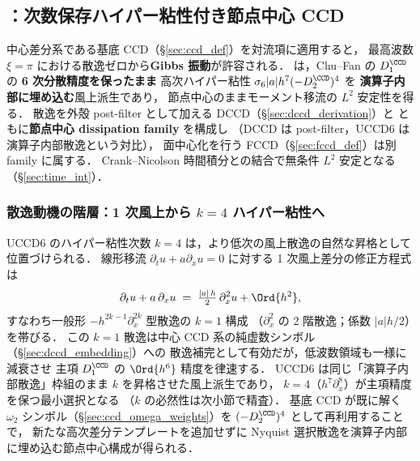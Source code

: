 %
%
\subsection{\texorpdfstring{{\UCCD[6]}：次数保存ハイパー粘性付き節点中心 CCD}{UCCD6：次数保存ハイパー粘性付き節点中心 CCD}}
\label{sec:uccd6_def}

中心差分系である基底 CCD（§\ref{sec:ccd_def}）を対流項に適用すると，
最高波数 $\xi=\pi$ における散逸ゼロから\textbf{Gibbs 振動}が許容される．
{\UCCD[6]} は，Chu--Fan の $D_1^{\CCD}$ の
\textbf{6 次分散精度を保ったまま}
高次ハイパー粘性 $\sigma_6|a|h^7(-D_2^{\CCD})^4$ を
\textbf{演算子内部に埋め込む}風上派生であり，
節点中心のままモーメント移流の $L^2$ 安定性を得る．
散逸を外殻 post-filter として加える DCCD（§\ref{sec:dccd_derivation}）と
ともに\textbf{節点中心 dissipation family} を構成し
（DCCD は post-filter，UCCD6 は演算子内部散逸という対比），
面中心化を行う FCCD（§\ref{sec:fccd_def}）は別 family に属する．
Crank--Nicolson 時間積分との結合で無条件 $L^2$ 安定となる
（§\ref{sec:time_int}）．

\subsubsection{散逸動機の階層：1 次風上から $k=4$ ハイパー粘性へ}
\label{sec:uccd6_dissipation_hierarchy}

UCCD6 のハイパー粘性次数 $k=4$ は，より低次の風上散逸の自然な昇格として位置づけられる．
線形移流 $\partial_t u + a\partial_x u = 0$ に対する 1 次風上差分の修正方程式は
\begin{equation}
  \partial_t u + a\,\partial_x u
  \;=\; \tfrac{|a|\,h}{2}\,\partial_x^{2} u + \Ord{h^{2}},
  \label{eq:uccd6_upwind_modified}
\end{equation}
すなわち一般形 $-h^{2k-1}\partial_x^{2k}$ 型散逸の $k=1$ 構成
（$\partial_x^{2}$ の 2 階散逸；係数 $|a|h/2$）を帯びる．
この $k=1$ 散逸は中心 CCD 系の純虚数シンボル（§\ref{sec:dccd_embedding}）への
散逸補完として有効だが，低波数領域も一様に減衰させ
主項 $D_1^{\CCD}$ の $\Ord{h^6}$ 精度を律速する．
UCCD6 は同じ「演算子内部散逸」枠組のまま $k$ を昇格させた風上派生であり，
$k=4$（$h^{7}\partial_x^{8}$）が主項精度を保つ最小選択となる
（$k$ の必然性は次小節で精査）．
基底 CCD が既に解く $\omega_2$ シンボル（§\ref{sec:ccd_omega_weights}）を
$(-D_2^{\CCD})^{4}$ として再利用することで，
新たな高次差分テンプレートを追加せずに
Nyquist 選択散逸を演算子内部に埋め込む節点中心構成が得られる．

